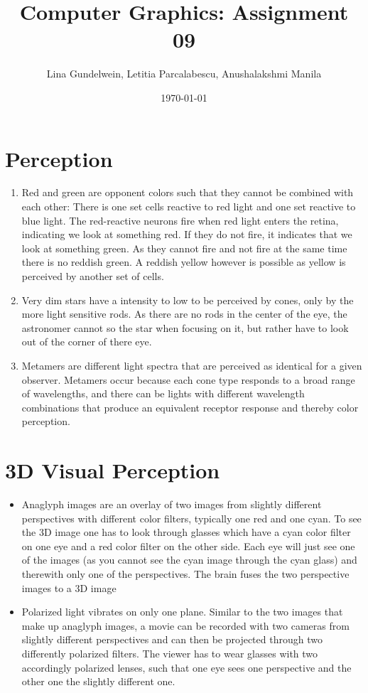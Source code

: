 \documentclass{article}
\title{Computer Graphics: Assignment 09} %
\author{Lina Gundelwein, Letitia Parcalabescu, Anushalakshmi Manila} %
\date{\today} %
\begin{document}
\maketitle 

\section{Perception}
\begin{enumerate}
\item Red and green are opponent colors such that they cannot be combined with each other: There is one set cells reactive to red light and one set reactive to blue light. The red-reactive neurons fire when red light enters the retina, indicating we look at something red. If they do not fire, it indicates that we look at something green. As they cannot fire and not fire at the same time there is no reddish green. A reddish yellow however is possible as yellow is perceived by another set of cells.
\item Very dim stars have a intensity to low to be perceived by cones, only by the more light sensitive rods. As there are no rods in the center of the eye, the astronomer cannot so the star when focusing on it, but rather have to look out of the corner of there eye.
\item Metamers are different light spectra that are perceived as identical for a given observer. Metamers occur because each cone type responds to a broad range of wavelengths, and there can be lights with different wavelength combinations that produce an equivalent receptor response and thereby color perception.
\end{enumerate}

\section{3D Visual Perception}
\begin{itemize}
\item Anaglyph images are an overlay of two images from slightly different perspectives with different color filters, typically one red and one cyan. To see the 3D image one has to look through glasses which have a cyan color filter on one eye and a red color filter on the other side. Each eye will just see one of the images (as you cannot see the cyan image through the cyan glass) and therewith only one of the perspectives. The brain fuses the two perspective images to a 3D image
\item Polarized light vibrates on only one plane. Similar to the two images that make up anaglyph images, a movie can be recorded with two cameras from slightly different perspectives and can then be projected through two differently polarized filters. The viewer has to wear glasses with two accordingly polarized lenses, such that one eye sees one perspective and the other one the slightly different one.
\end{itemize}
\end{document}
